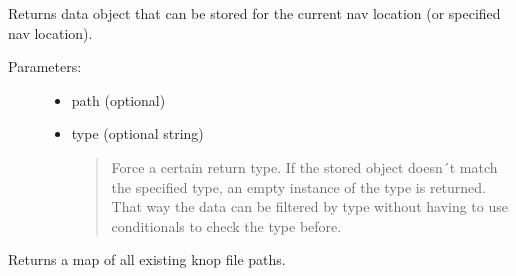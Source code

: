 \documentclass[letterpaper,10pt,english]{sphinxmanual}
\begin{document}
\begin{fulllineitems}

\begin{fulllineitems}
Returns data object that can be stored for the current nav location (or specified nav location).
\begin{description}
\item[{Parameters:}] \leavevmode\begin{itemize}
\item {} 
path (optional)

\item {} 
type (optional string)
\begin{quote}

Force a certain return type. If the stored object doesn´t match the specified
type, an empty instance of the type is returned. That way the data can be
filtered by type without having to use conditionals to check the type before.
\end{quote}

\end{itemize}

\end{description}

\end{fulllineitems}


\begin{fulllineitems}
\label{knop_nav:knop_nav.default}
\end{fulllineitems}



\begin{fulllineitems}
\end{fulllineitems}


\begin{fulllineitems}
\label{knop_nav:knop_nav.directorytree}
Returns a map of all existing knop file paths.

\end{fulllineitems}


\begin{fulllineitems}
\label{knop_nav:knop_nav.directorytreemap}
\end{fulllineitems}




\end{fulllineitems}
\end{document}
